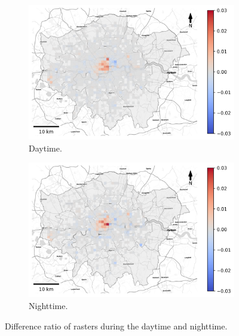 \documentclass{article}
\theoremstyle{definition}
\theoremstyle{remark}
\begin{document}
\begin{figure}[!h]

\begin{subfigure}{0.5\textwidth}
\includegraphics[width=1\linewidth]{figures/raster_diff_daytime.png} 
\caption{Daytime.}
\label{fig:raster_diff_daytime}
\end{subfigure}
\begin{subfigure}{0.5\textwidth}
\includegraphics[width=1\linewidth]{figures/raster_diff_nighttime.png}
\caption{Nighttime.}
\label{fig:raster_diff_nighttime}
\end{subfigure}

\caption{Difference ratio of rasters during the daytime and nighttime.} \label{fig:raster_diff_day}
\end{figure}
\end{document}

